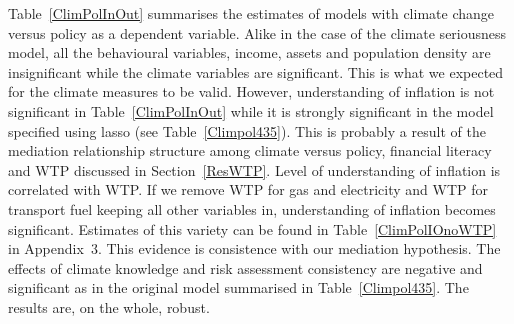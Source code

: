 \documentclass[a4paper,12pt]{article}
\begin{document}
Table~\ref{ClimPolInOut} summarises the estimates of models with climate change versus policy as a dependent variable. Alike in the case of the climate seriousness model, all the behavioural variables, income, assets and population density are insignificant while the climate variables are significant. This is what we expected for the climate measures to be valid. However, understanding of inflation is not significant in Table~\ref{ClimPolInOut} while it is strongly significant in the model specified using lasso (see Table~\ref{Climpol435}). This is probably a result of the mediation relationship structure among climate versus policy, financial literacy and WTP discussed in Section~\ref{ResWTP}. Level of understanding of inflation is correlated with WTP. If we remove WTP for gas and electricity and WTP for transport fuel keeping all other variables in, understanding of inflation becomes significant. Estimates of this variety can be found in Table~\ref{ClimPolIOnoWTP} in Appendix~$3$. This evidence is consistence with our mediation hypothesis.
The effects of climate knowledge and risk assessment consistency are negative and significant as in the original model summarised in Table~\ref{Climpol435}. The results are, on the whole, robust.
\end{document}
